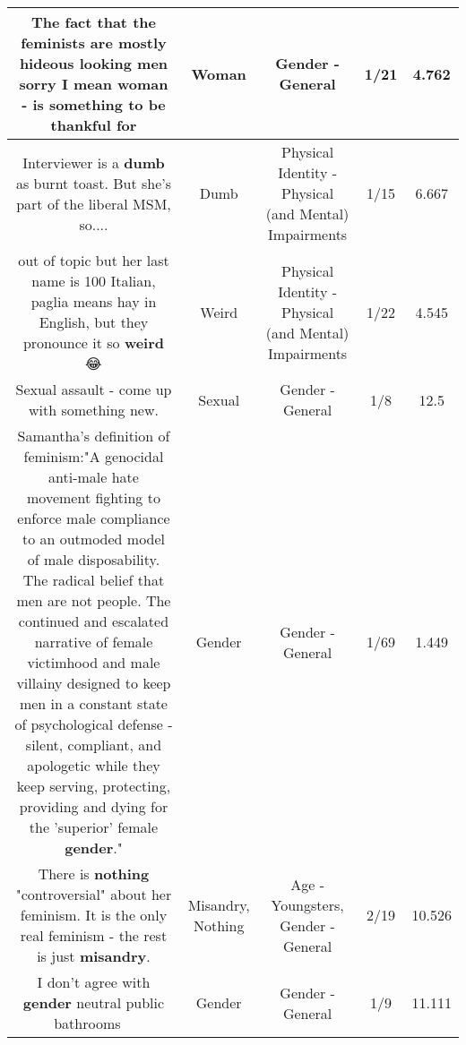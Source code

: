 \documentclass[11pt]{article}
\newlength\mylength
\begin{document}
\begin{center}
\begin{longtable}{|C{.65\mylength}|C{.30\mylength}|C{.12\mylength}|C{.12\mylength}|C{.12\mylength}|}
  \small The fact that the feminists are mostly hideous looking men sorry I mean \textbf{woman} - is something to be thankful for\normalsize   & Woman & Gender - General & 1/21 & 4.762 \\  \hline
  \small Interviewer is a \textbf{dumb} as burnt toast. But she's part of the liberal MSM, so....\normalsize   & Dumb & Physical Identity - Physical (and Mental) Impairments & 1/15 & 6.667 \\  \hline
  \small out of topic but her last name is 100 Italian, paglia means hay in English, but they pronounce it so \textbf{weird} 😂\normalsize   & Weird & Physical Identity - Physical (and Mental) Impairments & 1/22 & 4.545 \\  \hline
  \small Sexual assault - come up with something new.\normalsize   & Sexual & Gender - General & 1/8 & 12.5 \\  \hline
  \small Samantha's definition of feminism:"A genocidal anti-male hate movement fighting to enforce male compliance to an outmoded model of male disposability. The radical belief that men are not people. The continued and escalated narrative of female victimhood and male villainy designed to keep men in a constant state of psychological defense - silent, compliant, and apologetic while they keep serving, protecting, providing and dying for the 'superior' female \textbf{gender}."\normalsize   & Gender & Gender - General & 1/69 & 1.449 \\  \hline
  \small There is \textbf{nothing} "controversial" about her feminism. It is the only real feminism - the rest is just \textbf{misandry}.\normalsize   & Misandry, Nothing & Age - Youngsters, Gender - General & 2/19 & 10.526 \\  \hline
  \small I don't agree with \textbf{gender} neutral public bathrooms 👎🏼\normalsize   & Gender & Gender - General & 1/9 & 11.111 \\  \hline

\end{longtable}
\end{center}
\end{document}
